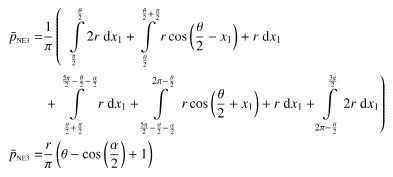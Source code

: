 \begin{align}
    \bar{p}_{\text{\tiny{NE3}}} =&\frac{1}{\pi} \left(\;\;\int\limits_{\frac{\pi}{2}}^{\frac{\theta}{2}}2 r\;\mathrm{d}x_{1}+\int\limits_{\frac{\theta}{2}}^{\frac{\theta}{2} + \frac{\pi}{2}}r \cos{\left (\frac{\theta}{2} - x_{1} \right )} + r\;\mathrm{d}x_{1}\right.\notag\\
 &\left.+\int\limits_{\frac{\theta}{2} + \frac{\pi}{2}}^{\frac{5 \pi}{2} - \frac{\theta}{2} - \frac{\alpha}{2}}r\;\mathrm{d}x_{1}+\int\limits_{\frac{5 \pi}{2} - \frac{\theta}{2} - \frac{\alpha}{2}}^{2 \pi - \frac{\theta}{2}}r \cos{\left (\frac{\theta}{2} + x_{1} \right )} + r\;\mathrm{d}x_{1}+\int\limits_{2 \pi - \frac{\theta}{2}}^{\frac{3 \pi}{2}}2 r\;\mathrm{d}x_{1}\right)\label{pNE3Def}\\
    \bar{p}_{\text{\tiny{NE3}}}  =& \frac{r}{\pi} \left(\theta - \cos{\left (\frac{\alpha}{2} \right )} + 1\right)\label{pNE3Sln}
\end{align}